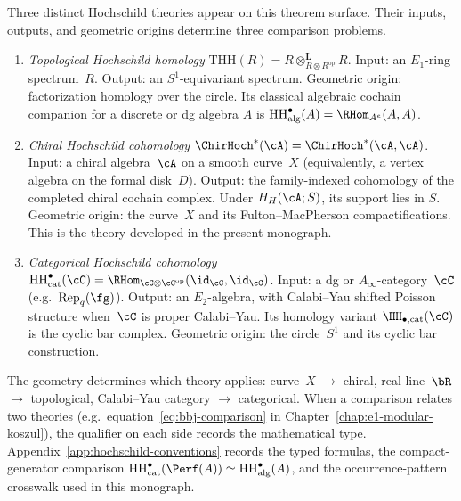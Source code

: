 \begin{convention}\label{conv:three-hochschild}
%
%
Three distinct Hochschild theories appear on this theorem surface.
Their inputs, outputs, and geometric origins determine three
comparison problems.

\begin{enumerate}[label=\textup{(\roman*)}]
\item \emph{Topological Hochschild homology}
 $\mathrm{THH}(R) = R \otimes^{\mathbf L}_{R \otimes R^{\mathrm{op}}} R$.
 Input: an $E_1$-ring spectrum~$R$.
 Output: an $S^1$-equivariant spectrum.
 Geometric origin: factorization homology over the circle.
 Its classical algebraic cochain companion for a discrete or dg algebra
 $A$ is $\mathrm{HH}^\bullet_{\mathrm{alg}}(A)
 = \RHom_{A^e}(A,A)$.

\item \emph{Chiral Hochschild cohomology}
 $\ChirHoch^*(\cA) = \ChirHoch^*(\cA, \cA)$.
 Input: a chiral algebra~$\cA$ on a smooth curve~$X$
 (equivalently, a vertex algebra on the formal disk~$D$).
 Output: the family-indexed cohomology of the completed chiral
 cochain complex.  Under \(H_H(\cA;S)\), its support lies in \(S\).
 Geometric origin: the curve~$X$ and its
 Fulton--MacPherson compactifications.
 This is the theory developed in the present monograph.

\item \emph{Categorical Hochschild cohomology}
 $\mathrm{HH}^\bullet_{\mathrm{cat}}(\cC)
 = \RHom_{\cC \otimes \cC^{\mathrm{op}}}(\id_\cC,\id_\cC)$.
 Input: a dg or $A_\infty$-category~$\cC$
 (e.g.\ $\operatorname{Rep}_q(\fg)$).
 Output: an $E_2$-algebra, with Calabi--Yau shifted Poisson
 structure when~$\cC$ is proper Calabi--Yau.
 Its homology variant $\HH_{\bullet,\mathrm{cat}}(\cC)$ is the
 cyclic bar complex.
 Geometric origin: the circle~$S^1$ and its
 cyclic bar construction.
\end{enumerate}

\noindent
The geometry determines which theory applies:
curve~$X$ $\to$ chiral,
real line~$\bR$ $\to$ topological,
Calabi--Yau category $\to$ categorical.
When a comparison relates two theories
(e.g.\ equation~\eqref{eq:bbj-comparison} in
Chapter~\ref{chap:e1-modular-koszul}),
the qualifier on each side records the mathematical type.
Appendix~\ref{app:hochschild-conventions} records the typed formulas,
the compact-generator comparison
$\mathrm{HH}^\bullet_{\mathrm{cat}}(\Perf(A))
\simeq \mathrm{HH}^\bullet_{\mathrm{alg}}(A)$,
and the occurrence-pattern crosswalk used in this monograph.
\end{convention}


